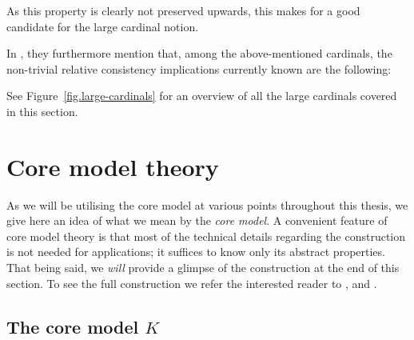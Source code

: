 \documentclass[../../main]{subfiles}
\begin{document}

As this property is clearly not preserved upwards, this makes for a good candidate for the large cardinal notion.


In \cite{Cutolo}, they furthermore mention that, among the above-mentioned cardinals, the non-trivial relative consistency implications currently known are the following:



See Figure~\ref{fig.large-cardinals} for an overview of all the large cardinals covered in this section.



\section{Core model theory}
\label{prelims.core-model-theory}

As we will be utilising the core model at various points throughout this thesis, we give here an idea of what we mean by the \textit{core model}. A convenient feature of core model theory is that most of the technical details regarding the construction is not needed for applications; it suffices to know only its abstract properties. That being said, we \textit{will} provide a glimpse of the construction at the end of this section. To see the full construction we refer the interested reader to \cite{MSc}, \cite{Zeman} and \cite{Kwithoutmeasurable}. 


\subsection{The core model $K$}
\end{document}
